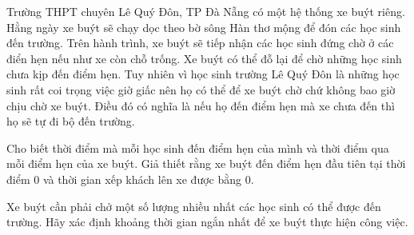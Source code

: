 Trường THPT chuyên Lê Quý Đôn, TP Đà Nẵng có một hệ thống xe buýt riêng. Hằng ngày xe buýt sẽ chạy dọc theo bờ sông Hàn thơ mộng để đón các học sinh đến trường. Trên hành trình, xe buýt sẽ   tiếp nhận các học sinh đứng chờ ở các điển hẹn nếu như xe còn chỗ trống. Xe buýt có thể đỗ lại để chờ những học sinh chưa kịp đến điểm hẹn. Tuy nhiên vì học sinh trường Lê Quý Đôn là những học sinh rất   coi trọng việc giờ giấc nên họ có thể để xe buýt chờ chứ không bao giờ chịu chờ xe buýt. Điều đó có nghĩa là nếu họ đến điểm hẹn mà xe chưa đến thì họ sẽ tự đi bộ đến trường.  

   Cho biết thời điểm mà mỗi học sinh đến điểm hẹn của mình và thời điểm qua mỗi điểm hẹn của xe buýt. Giả thiết rằng xe buýt đến điểm hẹn đầu tiên tại thời điểm 0 và thời gian xếp khách lên xe được bằng   0.  

   Xe buýt cần phải chở một số lượng nhiều nhất các học sinh có thể được đến trường. Hãy xác định khoảng thời gian ngắn nhất để xe buýt thực hiện công việc.